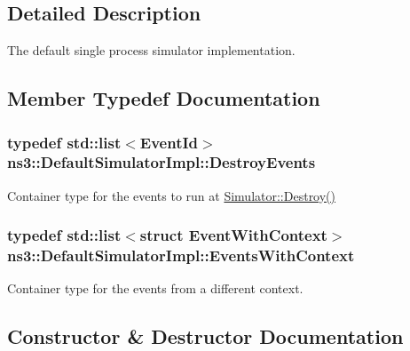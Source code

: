 \subsection{Detailed Description}
The default single process simulator implementation. 

\subsection{Member Typedef Documentation}
\subsubsection[{\texorpdfstring{Destroy\+Events}{DestroyEvents}}]{\setlength{\rightskip}{0pt plus 5cm}typedef {\bf std\+::list}$<${\bf Event\+Id}$>$ {\bf ns3\+::\+Default\+Simulator\+Impl\+::\+Destroy\+Events}\hspace{0.3cm}{\ttfamily [private]}}\hypertarget{classns3_1_1DefaultSimulatorImpl_ab9b6e40c5839c9e5755451f7c5e75406}{}\label{classns3_1_1DefaultSimulatorImpl_ab9b6e40c5839c9e5755451f7c5e75406}
Container type for the events to run at \hyperlink{classns3_1_1Simulator_a2a056e59a6623225df0957eda0ee8252}{Simulator\+::\+Destroy()} 
\subsubsection[{\texorpdfstring{Events\+With\+Context}{EventsWithContext}}]{\setlength{\rightskip}{0pt plus 5cm}typedef {\bf std\+::list}$<$struct {\bf Event\+With\+Context}$>$ {\bf ns3\+::\+Default\+Simulator\+Impl\+::\+Events\+With\+Context}\hspace{0.3cm}{\ttfamily [private]}}\hypertarget{classns3_1_1DefaultSimulatorImpl_a69a45d09d4651865afada01a8713ed38}{}\label{classns3_1_1DefaultSimulatorImpl_a69a45d09d4651865afada01a8713ed38}
Container type for the events from a different context. 

\subsection{Constructor \& Destructor Documentation}

